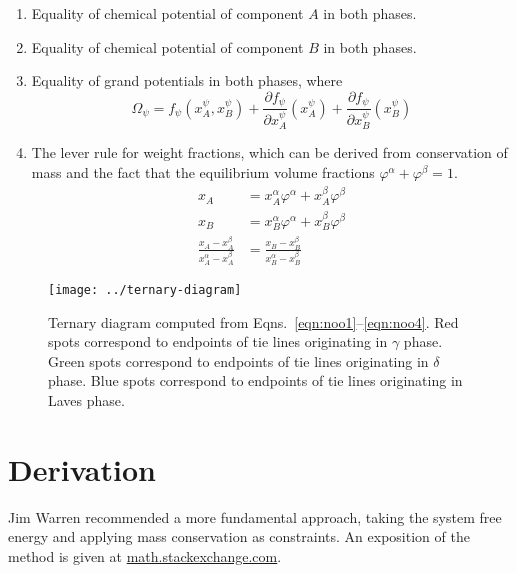 \documentclass[10pt]{article}
\begin{document}
\begin{enumerate}
    \item Equality of chemical potential of component $A$ in both phases.
    \item Equality of chemical potential of component $B$ in both phases.
    \item Equality of grand potentials in both phases, where
      \begin{equation}\label{eqn:gp}
        \Omega_{\psi} = f_{\psi}(x_A^{\psi}, x_B^{\psi}) +
                        \frac{\partial f_{\psi}}{\partial x_A^{\psi}}(x_A^{\psi}) +
                        \frac{\partial f_{\psi}}{\partial x_B^{\psi}}(x_B^{\psi})
      \end{equation}
    \item The lever rule for weight fractions, which can be derived from conservation of mass
          and the fact that the equilibrium volume fractions $\varphi^{\alpha} + \varphi^{\beta} = 1$.
      \begin{align}
        \label{eqn:consA}
        x_A &= x_A^{\alpha}\varphi^{\alpha} +
               x_A^{\beta} \varphi^{\beta} \\
        \label{eqn:consB}
        x_B &= x_B^{\alpha}\varphi^{\alpha} +
               x_B^{\beta} \varphi^{\beta} \\
        \label{eqn:lever}
        \frac{x_A - x_A^{\beta}}{x_A^{\alpha} - x_A^{\beta}} &=
        \frac{x_B - x_B^{\beta}}{x_B^{\alpha} - x_B^{\beta}}
      \end{align}
\end{enumerate}

\newpage
\begin{figure}[h]
  \texttt{[image: ../ternary-diagram]}
  \caption{Ternary diagram computed from Eqns.~\ref{eqn:noo1}--\ref{eqn:noo4}.
           Red spots correspond to endpoints of tie lines originating in $\gamma$ phase.
           Green spots correspond to endpoints of tie lines originating in $\delta$ phase.
           Blue spots correspond to endpoints of tie lines originating in Laves phase.
  }
  \label{fig:noo-diagram}
\end{figure}

\newpage
\section*{Derivation}

Jim Warren recommended a more fundamental approach, taking the system free energy
and applying mass conservation as constraints. An exposition of the method is given at
\href{https://math.stackexchange.com/questions/632/validating-a-mathematical-model-lagrange-formulation-and-geometry}
{math.stackexchange.com}.
\end{document}
